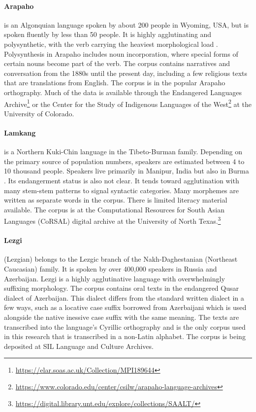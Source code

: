 \paragraph{Arapaho}
is an Algonquian language spoken by about 200 people in Wyoming, USA, but is spoken fluently by less than 50 people. It is highly agglutinating and polysynthetic, with the verb carrying the heaviest morphological load \citep{cowell_arapaho_2008}. Polysynthesis in Arapaho includes noun incorporation, where special forms of certain nouns become part of the verb. The corpus contains narratives and conversation from the 1880s until the present day, including a few religious texts that are translations from English. The corpus is in the popular Arapaho orthography. Much of the data is available through the Endangered Languages Archive\footnote{\url{https://elar.soas.ac.uk/Collection/MPI189644}} or the Center for the Study of Indigenous Languages of the West\footnote{\url{https://www.colorado.edu/center/csilw/arapaho-language-archives}} at the University of Colorado.

\paragraph{Lamkang} 
is a Northern Kuki-Chin language in the Tibeto-Burman family. Depending on the primary source of population numbers, speakers are estimated between 4 to 10 thousand people. Speakers live primarily in Manipur, India but also in Burma \citep{lamkang_2007}. Its endangerment status is also not clear. It tends toward agglutination with many stem-stem patterns to signal syntactic categories. Many morphemes are written as separate words in the corpus. There is limited literacy material available. The corpus is at the Computational Resources for South Asian Languages (CoRSAL) digital archive at the University of North Texas.\footnote{\url{https://digital.library.unt.edu/explore/collections/SAALT/}}

\paragraph{Lezgi} 
(Lezgian) belongs to the Lezgic branch of the Nakh-Daghestanian (Northeast Caucasian) family. It is spoken by over 400,000 speakers in Russia and Azerbaijan. Lezgi is a highly agglutinative language with overwhelmingly suffixing morphology. The corpus contains oral texts in the endangered Qusar dialect of Azerbaijan. This dialect differs from the standard written dialect in a few ways, such as a locative case suffix borrowed from Azerbaijani which is used alongside the native inessive case suffix with the same meaning. The texts are transcribed into the language's Cyrillic orthography and is the only corpus used in this research that is transcribed in a non-Latin alphabet. The corpus is being deposited at SIL Language and Culture Archives.

